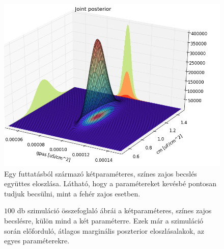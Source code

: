 \begin{figure}[h!]
	\centering
	\includegraphics[width=0.8\linewidth]{fig/cn1/JointP_cm_gpas(1).png}
	\caption[Egykompartmentumos modell, színes zaj, együttes poszterior eloszlása]{Egy futtatásból származó kétparaméteres, színes zajos becslés együttes eloszlása. Látható, hogy a paramétereket kevésbé pontosan tudjuk becsülni, mint a fehér zajos esetben.}
	\label{fig:cn1_joint}
\end{figure}

\begin{figure}[h!]
	\centering
	\caption[Egy kompartmentum, két paraméter, színes zaj eredmények]{$100$ db szimuláció összefoglaló ábrái a kétparaméteres, színes zajos becslésre, külön mind a két paraméterre. Ezek már a szimuláció során előforduló, átlagos marginális poszterior eloszlásalakok, az egyes paraméterekre.}
	\label{fig:cn1}
\end{figure}





